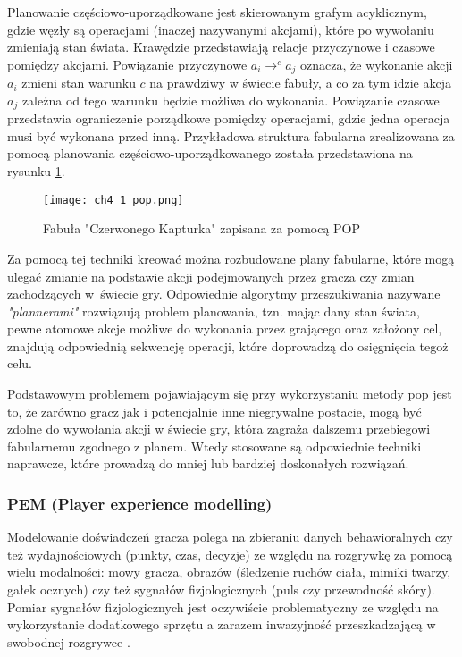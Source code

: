 Planowanie częściowo-uporządkowane jest skierowanym grafym acyklicznym, gdzie węzły są operacjami
(inaczej nazywanymi akcjami), które po wywołaniu zmieniają stan świata. Krawędzie przedstawiają
relacje przyczynowe i czasowe pomiędzy akcjami. Powiązanie przyczynowe $a_{i} \rightarrow^{c}a_{j}$
oznacza, że wykonanie akcji $a_{i}$ zmieni stan warunku $c$ na prawdziwy w świecie fabuły, a co za
tym idzie akcja $a_{j}$ zależna od tego warunku będzie możliwa do wykonania. Powiązanie czasowe
przedstawia ograniczenie porządkowe pomiędzy operacjami, gdzie jedna operacja musi być wykonana przed
inną\cite{game_ai_storytelling}. Przykładowa struktura fabularna zrealizowana za pomocą planowania
częściowo-uporządkowanego została przedstawiona na rysunku \ref{fig:ch4_1_pop}.

\begin{figure}[h]
    \centering
    \texttt{[image: ch4\_1\_pop.png]}
    \caption{Fabuła "Czerwonego Kapturka" zapisana za pomocą POP}
    \label{fig:ch4_1_pop}
\end{figure}

Za pomocą tej techniki kreować można rozbudowane plany fabularne, które mogą ulegać zmianie na
podstawie akcji podejmowanych przez gracza czy zmian zachodzących w~świecie gry. Odpowiednie algorytmy
przeszukiwania nazywane \textit{"plannerami"} rozwiązują problem planowania, tzn. mając dany stan
świata, pewne atomowe akcje możliwe do wykonania przez grającego oraz założony cel, znajdują
odpowiednią sekwencję operacji, które doprowadzą do osięgnięcia tegoż celu\cite{game_ai_storytelling}.

Podstawowym problemem pojawiającym się przy wykorzystaniu metody \gls{pop} jest to, że zarówno gracz jak i
potencjalnie inne niegrywalne postacie, mogą być zdolne do wywołania akcji w świecie gry, która
zagraża dalszemu przebiegowi fabularnemu zgodnego z planem\cite{characters_and_directors}. Wtedy
stosowane są odpowiednie techniki naprawcze, które prowadzą do mniej lub bardziej doskonałych rozwiązań.

\subsubsection*{PEM (Player experience modelling)}

Modelowanie doświadczeń gracza polega na zbieraniu danych behawioralnych czy też wydajnościowych
(punkty, czas, decyzje) ze względu na rozgrywkę za pomocą wielu modalności: mowy gracza, obrazów
(śledzenie ruchów ciała, mimiki twarzy, gałek ocznych) czy też sygnałów fizjologicznych (puls czy
przewodność skóry). Pomiar sygnałów fizjologicznych jest oczywiście problematyczny ze względu na
wykorzystanie dodatkowego sprzętu a zarazem inwazyjność przeszkadzającą w swobodnej rozgrywce
\cite{reusable_game_ai}.

